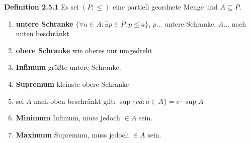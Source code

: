 \textbf{Definition 2.5.1} Es sei $(P;\leq )$ eine partiell geordnete Menge und $A\subseteq P$.
\begin{enumerate}
    \item \textbf{untere Schranke} $\{\forall a \in A :\exists p\in P:p\leq a\}$, $p$... untere Schranke, $A$... nach unten beschränkt
    \item \textbf{obere Schranke} wie oberes nur umgedreht
    \item \textbf{Infimum} größte untere Schranke.
    \item \textbf{Supremum} kleinste obere Schranke
    \item sei $A$ nach oben beschränkt gilt: $\sup \{ca:a\in A\} = c\cdot \sup A$
    \item \textbf{Minimum} Infimum, muss jedoch $\in A$ sein.
    \item \textbf{Maximum} Supremum, muss jedoch $\in A$ sein.
\end{enumerate}
